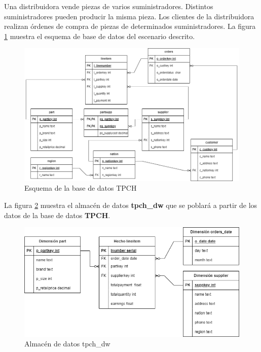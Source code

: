 Una distribuidora vende piezas de varios suministradores. Distintos suministradores pueden 
producir la misma pieza. Los clientes de la distribuidora realizan \'ordenes de compra 
de piezas de determinados suministradores. La figura \ref{fig:transactionaltpch} muestra el esquema de base de datos 
del escenario descrito.

\begin{figure}
  \centering
  \includegraphics[scale=0.5]{Graphics/tpch-tpch-transactional.drawio (5).png}
  \caption{Esquema de la base de datos TPCH}
  \label{fig:transactionaltpch}
\end{figure}

La figura \ref{fig:warehousetpch} muestra el almacén de datos \textbf{tpch\_dw} que se poblar\'a a partir de los 
datos de la base de datos \textbf{TPCH}.

\begin{figure}
  \centering
  \includegraphics[scale=0.5]{Graphics/tpch-tpch-warehouse.drawio.png}
  \caption{Almacén de datos tpch\_dw}
  \label{fig:warehousetpch}
\end{figure}

